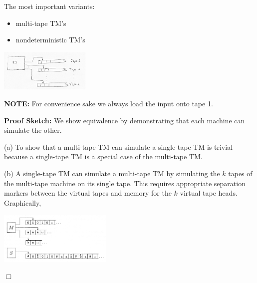 \documentclass[a4paper,blends,pdf,colorBG,slideColor]{prosper}
\begin{document}
The most important variants:
\begin{itemize}
\item multi-tape TM's
\item nondeterministic TM's
\end{itemize}

\vspace{1in}
\es

{\scriptsize
{}
}
\begin{center}
\includegraphics[height=20mm]{images/mt-tm.eps}
\end{center}
{\bf NOTE:} For convenience sake we always load the input onto tape 1.
\es


{\bf Proof Sketch:} We show equivalence by demonstrating that each machine can 
simulate the other.

(a) To show that a multi-tape TM can simulate a single-tape TM is trivial because a
single-tape TM is a special case of the multi-tape TM.

(b) A single-tape TM can simulate a multi-tape TM by simulating the $k$ tapes of the
multi-tape machine on its single tape.  This requires appropriate separation markers between the virtual tapes and
memory for the $k$ virtual tape heads.  Graphically,
\begin{center}
\includegraphics[height=25mm]{images/mt-tm-example.eps}
\end{center}
$\Box$
\es
\end{document}
